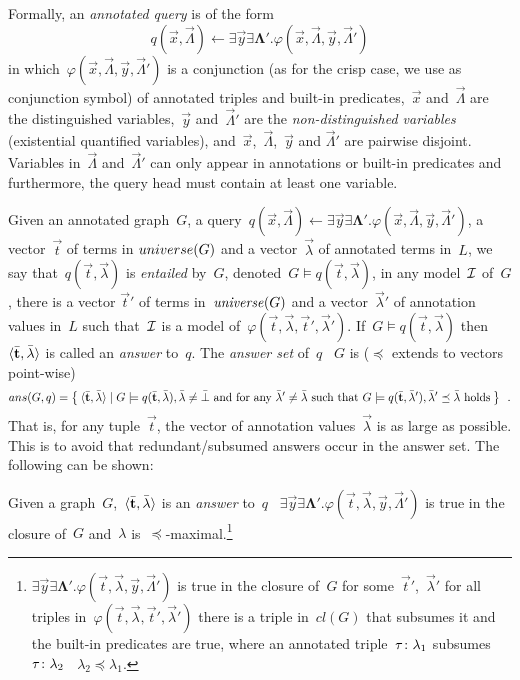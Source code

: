 \noindent Formally, an \emph{annotated query} is of the form
\[
q(\vec{x},\vec{\Lambda}) \leftarrow \exists \vec{y}\exists\mathbf{\Lambda}'.\varphi(\vec{x},\vec{\Lambda},\vec{y},\vec{\Lambda}')
\]
in which~$\varphi(\vec{x}, \vec{\Lambda},\vec{y},\vec{\Lambda}')$ is a conjunction (as for the crisp case, we use
\character{,} as conjunction symbol) of annotated triples and built-in predicates,~$\vec{x}$ and~$ \vec{\Lambda}$ are
the distinguished variables,~$\vec{y}$ and~$\vec{\Lambda}'$ are the \emph{non-distinguished variables} (existential
quantified variables), and~$\vec{x}$,~$\vec{\Lambda}$,~$\vec{y}$ and $\vec{\Lambda}'$ are pairwise disjoint.
%
Variables in~$\vec{\Lambda}$ and~$\vec{\Lambda}'$ can only appear in annotations or built-in predicates and furthermore,
the query head must contain at least one variable.

Given an annotated graph~$G$, a query~$q(\vec{x}, \vec{\Lambda}) \leftarrow \exists
\vec{y}\exists\mathbf{\Lambda}'.\varphi(\vec{x}, \vec{\Lambda}, \vec{y},\vec{\Lambda}')$, a vector~$\vec{t}$ of terms in
$uni\-verse(G)$ and a vector~$\vec{\lambda}$ of annotated terms in~$L$, we say that~$q(\vec{t}, \vec{\lambda})$ is
\emph{entailed} by~$G$, denoted~$G \models q(\vec{t}, \vec{\lambda})$, \iff in any model~$\mathcal{I}$ of~$G$, there is a vector
$\vec{t}'$ of terms in~$ \mathit{universe}(G)$ and a vector~$\vec{\lambda}'$ of annotation values in~$L$ such that~$\mathcal{I}$ is a
model of~$\varphi(\vec{t}, \vec{\lambda}, \vec{t}', \vec{\lambda}')$. If~$G \models q(\vec{t}, \vec{\lambda})$ then
$\langle \bar{\mathbf t}, \bar{\mathbf \lambda} \rangle$ is called an \emph{answer} to~$q$. The \emph{answer set} of~$q$ \wrt~$G$ is ($\preceq$
extends to vectors point-wise)
%
\[
ans(G, q) = \left\{\: \langle \bar{\mathbf t}, \bar{\mathbf \lambda} \rangle \mid G \models  q(\bar{\mathbf t}, \bar{\mathbf \lambda}), \bar{\mathbf \lambda} \neq \bar{\mathbf \bot}
  \mbox { and for any }  \bar{\mathbf \lambda}' \neq \bar{\mathbf \lambda}
  \mbox { such that } G \models  q(\bar{\mathbf t}, \bar{\mathbf \lambda}'), \bar{\mathbf \lambda}' \preceq \bar{\mathbf \lambda}  \mbox { holds} \:\right\} \enspace .
\]
%
\noindent That is, for any tuple~$\vec{t}$, the vector of annotation values~$\vec{\lambda}$ is as large as
possible. This is to avoid that redundant/subsumed answers occur in the answer set.  The following can be shown:
%
\begin{proposition}\label{propU2}
  Given a graph~$G$,~$\langle \bar{\mathbf t}, \bar{\mathbf \lambda} \rangle$ is an \emph{answer} to~$q$ \iff~$\exists
  \vec{y}\exists\mathbf{\Lambda}'.\varphi(\vec{t}, \vec{\lambda}, \vec{y},\vec{\Lambda}')$ is true in the closure of~$G$
  and~$\lambda$ is~$\preceq$-maximal.\footnote{$\exists \vec{y}\exists\mathbf{\Lambda}'.\varphi(\vec{t}, \vec{\lambda},
    \vec{y},\vec{\Lambda}')$ is true in the closure of~$G$ \iff for some~$\vec{t}'$,~$\vec{\lambda}'$ for all triples
    in~$\varphi(\vec{t},\vec{\lambda},\vec{t}',\vec{\lambda}')$ there is a triple in~$cl(G)$ that subsumes it and the
    built-in predicates are true, where an annotated triple~$\mbox{$\tau\colon\lambda_{1}$}$
    subsumes~$\mbox{$\tau\colon\lambda_{2}$}$ \iff~$\lambda_{2} \preceq \lambda_{1}$.}
\end{proposition}



